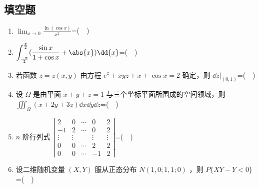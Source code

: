 \subsection{填空题}
\begin{enumerate}
\item $\displaystyle \lim_{x \to 0} \frac{\ln(\cos x)}{x^2}$=($\quad$)
\item $\displaystyle \int_\frac{-\pi}{2}^\frac{\pi}{2}(\frac{\sin x}{1+\cos x}+\abs{x})\dd{x}$=($\quad$)
\item 若函数 $z=z(x,y)$ 由方程 $e^z+xyz+x+\cos x=2$ 确定，则 $\dd{z}|_{(0,1)}$=($\quad$)
\item 设 $\Omega$ 是由平面 $x+y+z=1$ 与三个坐标平面所围成的空间领域，则$\displaystyle {\iiint}_{\Omega}(x+2y+3z)\dd{x}\dd{y}\dd{z}$=($\quad$)
\item $n$ 阶行列式 $\left|\begin{array}{ccccc}2 & 0 & \cdots & 0 & 2 \\ -1 & 2 & \cdots & 0 & 2 \\ \vdots & \vdots & & \vdots & \vdots \\ 0 & 0 & \cdots & 2 & 2 \\ 0 & 0 & \cdots & -1 & 2\end{array}\right|$=($\quad$)
\item 设二维随机变量 $(X,Y)$ 服从正态分布 $N(1,0;1,1;0)$  ，则 $P\{XY-Y<0\}$=($\quad$)
\end{enumerate}



